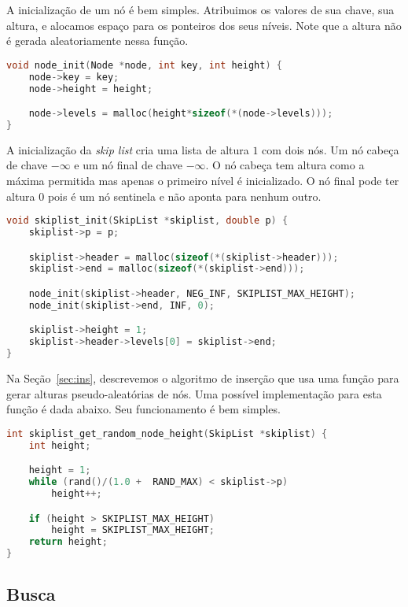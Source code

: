 \documentclass[paper=a4, fontsize=11pt]{scrartcl} %
\numberwithin{equation}{section}
\numberwithin{figure}{section}
\numberwithin{table}{section}
\numberwithin{definition}{section}
\numberwithin{theorem}{section}
\numberwithin{property}{section}
\numberwithin{proposition}{section}
\renewcommand{\sl}{\textit{skip list}\xspace}
\begin{document}
A inicialização de um nó é bem simples. Atribuimos os valores de sua chave, sua altura, e alocamos espaço
para os ponteiros dos seus níveis. Note que a altura não é gerada aleatoriamente nessa função.
\begin{lstlisting}[caption=Inicialização de um nó., language=C]
void node_init(Node *node, int key, int height) {
    node->key = key;
    node->height = height;

    node->levels = malloc(height*sizeof(*(node->levels)));
}
\end{lstlisting}

A inicialização da \sl cria uma lista de altura $1$ com dois nós. Um nó cabeça de chave $-\infty$ e um nó final de
chave $-\infty$. O nó cabeça tem altura como a máxima permitida mas apenas o primeiro nível é inicializado. O nó final pode 
ter altura $0$ pois é um nó sentinela e não aponta para nenhum outro.

\begin{lstlisting}[caption=Inicialização de uma skip list., language=C]
void skiplist_init(SkipList *skiplist, double p) {
    skiplist->p = p;

    skiplist->header = malloc(sizeof(*(skiplist->header)));
    skiplist->end = malloc(sizeof(*(skiplist->end)));

    node_init(skiplist->header, NEG_INF, SKIPLIST_MAX_HEIGHT);
    node_init(skiplist->end, INF, 0);

    skiplist->height = 1;
    skiplist->header->levels[0] = skiplist->end;
}
\end{lstlisting}

Na Seção~\ref{sec:ins}, descrevemos o algoritmo de inserção que usa uma função para gerar alturas pseudo-aleatórias de nós. Uma
possível implementação para esta função é dada abaixo. 
Seu funcionamento é bem simples.

\begin{lstlisting}[caption=Geração de alturas., language=C]
int skiplist_get_random_node_height(SkipList *skiplist) {
    int height;

    height = 1;
    while (rand()/(1.0 +  RAND_MAX) < skiplist->p)
        height++;

    if (height > SKIPLIST_MAX_HEIGHT)
        height = SKIPLIST_MAX_HEIGHT;
    return height;
}
\end{lstlisting}

\FloatBarrier
\subsection{Busca}
\end{document}
